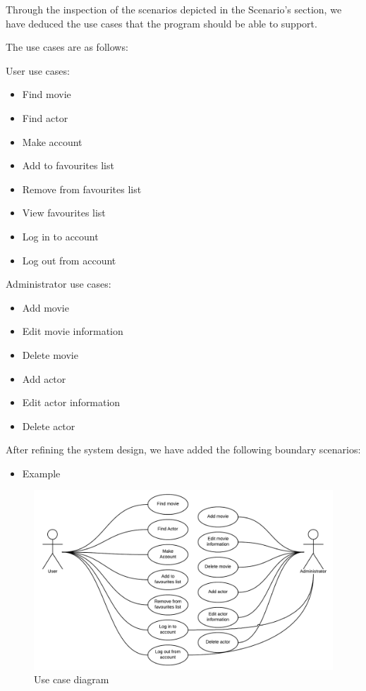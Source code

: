 Through the inspection of the scenarios depicted in the Scenario’s section, we have deduced the use cases that the program should be able to support.

The use cases are as follows:

User use cases:
\begin{itemize}
	\setlength{\itemsep}{-5pt}
	\item Find movie
	\item Find actor
	\item Make account
	\item Add to favourites list
	\item Remove from favourites list
	\item View favourites list
	\item Log in to account
	\item Log out from account
\end{itemize}

Administrator use cases:
\begin{itemize}
	\item Add movie
	\item Edit movie information
	\item Delete movie
	\item Add actor
	\item Edit actor information
	\item Delete actor
\end{itemize}

After refining the system design, we have added the following boundary scenarios:
\begin{itemize}
	\setlength{\itemsep}{-5pt}
	
	\item Example
\end{itemize}

\begin{figure}[H]
\includegraphics[width=\linewidth]{img/usecasediagram.png}
\caption{Use case diagram}
\label{fig:use case diagram}
\end{figure}

